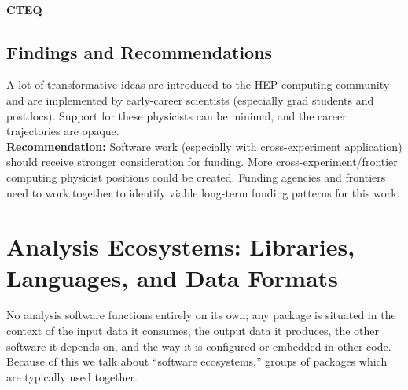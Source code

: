 \paragraph{CTEQ}

\subsection{Findings and Recommendations}
A lot of transformative ideas are introduced to the HEP computing community and are implemented by early-career scientists (especially grad students and postdocs). Support for these physicists can be minimal, and the career trajectories are opaque.\\
\textbf{Recommendation:} Software work (especially with cross-experiment application) should receive stronger consideration for funding. More cross-experiment/frontier computing physicist positions could be created.  Funding agencies and frontiers need to work together to identify viable long-term funding patterns for this work.



\section{Analysis Ecosystems: Libraries, Languages, and Data Formats}
No analysis software functions entirely on its own; any package is situated in the context of the input data it consumes, the output data it produces, the other software it depends on, and the way it is configured or embedded in other code. Because of this we talk about ``software ecosystems,'' groups of packages which are typically used together.

